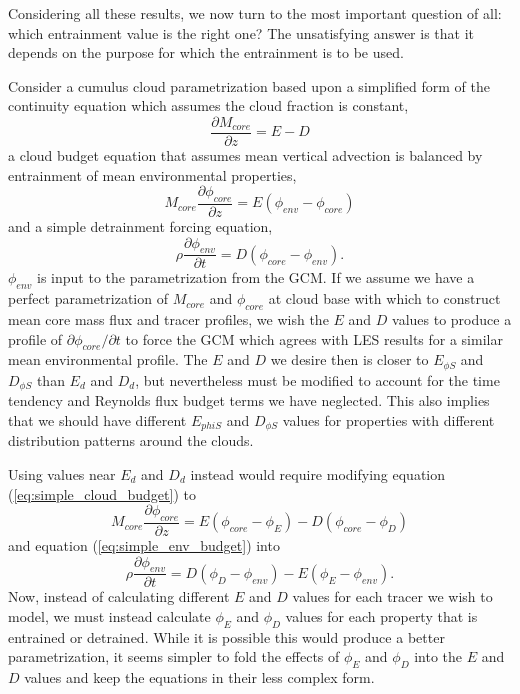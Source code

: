 \documentclass[12pt]{article}
\begin{document}
Considering all these results, we now turn to the most important question of 
all: which entrainment value is the right one?  The unsatisfying answer is that
it depends on the purpose for which the entrainment is to be used.

Consider a cumulus cloud parametrization based upon a simplified form of the continuity equation which assumes the cloud fraction is constant,
\begin{equation}
    \label{eq:simple_continuity}
    \frac{\partial M_{core}}{\partial z} = E - D
\end{equation}
a cloud budget equation that assumes mean vertical advection is balanced by 
entrainment of mean environmental properties,
\begin{equation}
    \label{eq:simple_cloud_budget}
    M_{core} \frac{\partial \phi_{core}}{\partial z} = E(\phi_{env} - \phi_{core})
\end{equation}
and a simple detrainment forcing equation,
\begin{equation}
    \label{eq:simple_env_budget}
    \rho \frac{\partial \phi_{env}}{\partial t} = D(\phi_{core} - \phi_{env}).
\end{equation}
$\phi_{env}$ is input to the parametrization from the GCM.  If we assume we have a perfect parametrization of $M_{core}$ and $\phi_{core}$ at cloud base with
which to construct mean core mass flux and tracer profiles, we wish the $E$ 
and $D$ values to produce a profile of $\partial \phi_{core} / \partial t$ 
to force the GCM which agrees with LES results for a similar mean environmental
profile.  The $E$ and $D$ we desire then is closer to $E_{\phi S}$ and $D_{\phi S}$
than $E_d$ and $D_d$, but nevertheless must be modified to account for the 
time tendency and Reynolds flux budget terms we have neglected.  This also 
implies that we should have different $E_{phi S}$ and $D_{\phi S}$ values for 
properties with different distribution patterns around the clouds.

Using values near $E_d$ and $D_d$ instead would require modifying equation 
(\ref{eq:simple_cloud_budget}) to
\begin{equation}
    \label{eq:less_simple_cloud_budget}
    M_{core} \frac{\partial \phi_{core}}{\partial z} 
       = E(\phi_{core} - \phi_E) - D(\phi_{core} - \phi_D)
\end{equation}
and equation (\ref{eq:simple_env_budget}) into
\begin{equation}
    \label{eq:less_simple_env_budget}
    \rho \frac{\partial \phi_{env}}{\partial t} 
       = D(\phi_D - \phi_{env}) - E(\phi_E - \phi_{env}).
\end{equation}
Now, instead of calculating different $E$ and $D$ values for each tracer we 
wish to model, we must instead calculate $\phi_E$ and $\phi_D$ values for 
each property that is entrained or detrained.  While it is possible this would
produce a better parametrization, it seems simpler to fold the effects of 
$\phi_E$ and $\phi_D$ into the $E$ and $D$ values and keep the equations in 
their less complex form.
\end{document}
